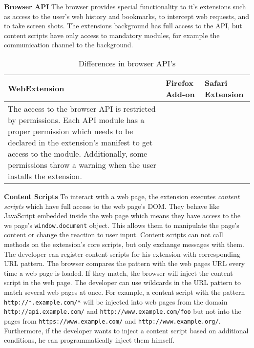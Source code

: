 	\textbf{Browser API} The browser provides special functionality to it's extensions such as access to the user's web history and bookmarks, to intercept web requests, and to take screen shots. The extensions background has full access to the API, but content scripts have only access to mandatory modules, for example the communication channel to the background. 
	
	\begin{table}[h]
		\begin{tabular}{|p{}|p{}|p{}|}\hline
			\textbf{WebExtension} & \textbf{Firefox Add-on} & \textbf{Safari Extension} \\ \hline
			The access to the browser API is restricted by permissions. Each API module has a proper permission which needs to be declared in the extension's manifest to get access to the module. Additionally, some permissions throw a warning when the user installs the extension. & 
			& 
			 \\ \hline 
		\end{tabular}
		\caption{Differences in browser API's}
	\end{table}

	\textbf{Content Scripts} To interact with a web page, the extension executes \textit{content scripts} which have full access to the web page's DOM. They behave like JavaScript embedded inside the web page which means they have access to the we page's \texttt{window.document} object. This allows them to manipulate the page's content or change the reaction to user input. Content scripts can not call methods on the extension's core scripts, but only exchange messages with them. \\ 
	The developer can register content scripts for his extension with corresponding URL pattern. The browser compares the pattern with the web pages URL every time a web page is loaded. If they match, the browser will inject the content script in the web page. The developer can use wildcards in the URL pattern to match several web pages at once. For example, a content script with the pattern \texttt{http://*.example.com/*} will be injected into web pages from the domain \texttt{http://api.example.com/} and \texttt{http://www.example.com/foo} but not into the pages from \texttt{https://www.example.com/} and \texttt{http://www.example.org/}. Furthermore, if the developer wants to inject a content script based on additional conditions, he can programmatically inject them himself. \\
	
